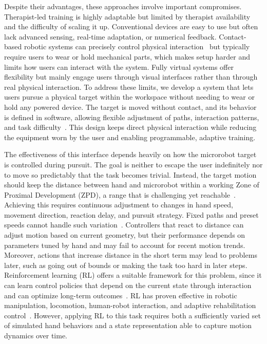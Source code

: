 \documentclass[journal,twoside,web]{ieeecolor2}
\begin{document}
Despite their advantages, these approaches involve important compromises. Therapist-led training is highly adaptable but limited by therapist availability and the difficulty of scaling it up. Conventional devices are easy to use but often lack advanced sensing, real-time adaptation, or numerical feedback. Contact-based robotic systems can precisely control physical interaction~\cite{b17} but typically require users to wear or hold mechanical parts, which makes setup harder and limits how users can interact with the system. Fully virtual systems offer flexibility but mainly engage users through visual interfaces rather than through real physical interaction. To address these limits, we develop a system that lets users pursue a physical target within the workspace without needing to wear or hold any powered device. The target is moved without contact, and its behavior is defined in software, allowing flexible adjustment of paths, interaction patterns, and task difficulty~\cite{b18,b19,b20}. This design keeps direct physical interaction while reducing the equipment worn by the user and enabling programmable, adaptive training.

The effectiveness of this interface depends heavily on how the microrobot target is controlled during pursuit. The goal is neither to escape the user indefinitely nor to move so predictably that the task becomes trivial. Instead, the target motion should keep the distance between hand and microrobot within a working Zone of Proximal Development (ZPD), a range that is challenging yet reachable~\cite{b21,b22}. Achieving this requires continuous adjustment to changes in hand speed, movement direction, reaction delay, and pursuit strategy. Fixed paths and preset speeds cannot handle such variation~\cite{b23,b24,b25}. Controllers that react to distance can adjust motion based on current geometry, but their performance depends on parameters tuned by hand and may fail to account for recent motion trends. Moreover, actions that increase distance in the short term may lead to problems later, such as going out of bounds or making the task too hard in later steps. Reinforcement learning (RL) offers a suitable framework for this problem, since it can learn control policies that depend on the current state through interaction and can optimize long-term outcomes~\cite{b26}. RL has proven effective in robotic manipulation, locomotion, human-robot interaction, and adaptive rehabilitation control~\cite{b27,b28,b29,b30,b31,b32}. However, applying RL to this task requires both a sufficiently varied set of simulated hand behaviors and a state representation able to capture motion dynamics over time.
\end{document}
